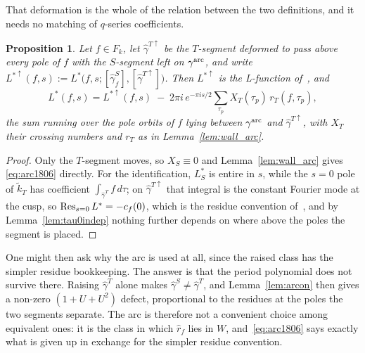 \documentclass[11pt]{article}
\newtheorem{proposition}[theorem]{Proposition}
\newcommand{\tk}{\widetilde{k}_T}
\begin{document}
That deformation is the whole of the relation between the two definitions, and it needs no
matching of $q$-series coefficients.

\begin{proposition}\label{prop:arc1806}
Let $f\in F_k$, let $\hat\gamma^{T\uparrow}$ be the $T$-segment deformed to pass above every pole
of $f$ with the $S$-segment left on $\gamma^{\rm arc}$, and write
$L^{*\uparrow}(f,s):=L^*\big(f,s;[\hat\gamma^S_f],[\hat\gamma^{T\uparrow}]\big)$. Then
$L^{*\uparrow}$ is the L-function of~\cite{1806}, and
\begin{equation}\label{eq:arc1806}
L^*(f,s)=L^{*\uparrow}(f,s)\;-\;2\pi i\,e^{-\pi is/2}
\sum_{\tau_p}X_T(\tau_p)\,r_T(f,\tau_p),
\end{equation}
the sum running over the pole orbits of $f$ lying between $\gamma^{\rm arc}$ and
$\hat\gamma^{T\uparrow}$, with $X_T$ their crossing numbers and $r_T$ as in
Lemma~\ref{lem:wall_arc}.
\end{proposition}

\begin{proof}
Only the $T$-segment moves, so $X_S\equiv0$ and Lemma~\ref{lem:wall_arc} gives
\eqref{eq:arc1806} directly. For the identification, $L^*_S$ is entire in $s$, while the
$s=0$ pole of $\tk$ has coefficient $\int_{\hat\gamma^T}f\,d\tau$; on $\hat\gamma^{T\uparrow}$
that integral is the constant Fourier mode at the cusp, so
$\mathop{\rm Res}_{s=0}L^*=-c_f(0)$, which is the residue convention of~\cite{1806}, and by
Lemma~\ref{lem:tau0indep} nothing further depends on where above the poles the segment is placed.
\end{proof}


One might then ask why the arc is used at all, since the raised class has the simpler residue
bookkeeping. The answer is that the period polynomial does not survive there. Raising
$\hat\gamma^T$ alone makes $\hat\gamma^S\ne\hat\gamma^T$, and Lemma~\ref{lem:arcon} then gives a
non-zero $(1+U+U^2)$ defect, proportional to the residues at the poles the two segments separate.
The arc is therefore not a convenient choice among equivalent ones: it is the class in which
$\hat r_f$ lies in $W$, and~\eqref{eq:arc1806} says exactly what is given up in exchange for the
simpler residue convention.
\end{document}
